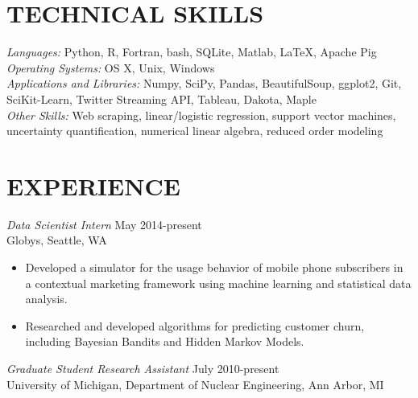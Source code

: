 \documentclass[margin, 10pt]{res} %
\begin{document}
\begin{resume}


\section{TECHNICAL SKILLS} 

{\sl Languages:} Python, R, Fortran, bash, SQLite, Matlab, \LaTeX, Apache Pig \\
{\sl Operating Systems:} OS X, Unix, Windows \\
{\sl Applications and Libraries:} Numpy, SciPy, Pandas, BeautifulSoup, ggplot2, Git, SciKit-Learn, Twitter Streaming API, Tableau, Dakota, Maple  \\
{\sl Other Skills:} Web scraping, linear/logistic regression, support vector machines, uncertainty quantification, numerical linear algebra, reduced order modeling

 
\section{EXPERIENCE}

{\sl Data Scientist Intern} \hfill May 2014-present \\
Globys, Seattle, WA

\begin{itemize} \itemsep -2pt %
\item Developed a simulator for the usage behavior of mobile phone subscribers in a contextual marketing framework using machine learning and statistical data analysis.
\item Researched and developed algorithms for predicting customer churn, including Bayesian Bandits and Hidden Markov Models. 
\end{itemize}

{\sl Graduate Student Research Assistant} \hfill July 2010-present \\
University of Michigan, Department of Nuclear Engineering, Ann Arbor, MI


\end{resume}
\end{document}
